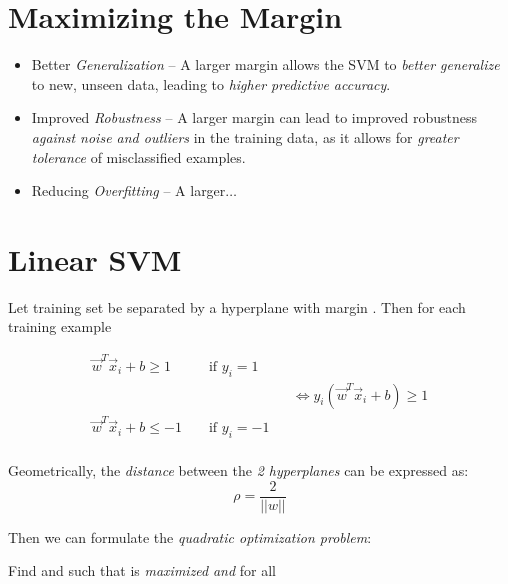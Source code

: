\documentclass[
	title={SVM}
]{cs584notes}
\begin{document}
\section{Maximizing the Margin}\label{sec:maximizing-the-margin}
\begin{itemize}
	\item Better \emph{Generalization} -- A larger margin allows the SVM to \emph{better generalize} to new, unseen data, leading to \emph{higher predictive accuracy}.
	\item Improved \emph{Robustness} -- A larger margin can lead to improved robustness \emph{against noise and outliers} in the training data, as it allows for \emph{greater tolerance} of misclassified examples.
	\item Reducing \emph{Overfitting} -- A larger$\dots$
\end{itemize}

\section{Linear SVM}\label{sec:linear-svm}
Let training set  be separated by a hyperplane with margin \data{$\rho$}.
Then for each training example 

\begin{equation*}
\begin{aligned}
	\vec{w}^{T}\vec{x}_{i} + b \geq 1 && \mbox{ if } y_{i} = 1 &&\\
	&&&& \Leftrightarrow y_{i}\left( \vec{w}^{T}\vec{x}_{i} + b \right) \geq 1\\
	\vec{w}^{T}\vec{x}_{i} + b \leq -1 && \mbox{ if } y_{i} = -1 &&\\
\end{aligned}
\end{equation*}

Geometrically, the \emph{distance} between the \emph{2 hyperplanes} can be expressed as:
\begin{equation}
	\rho = \frac{2}{||w||}
	\label{eq:hyperplane-distance}
\end{equation}

Then we can formulate the \emph{quadratic optimization problem}:

\begin{svmbox}
	Find  and  such that \data{\[ \rho = \frac{2}{||\vec{w}||} \]} is \emph{maximized} \emph{and} for all 
\end{svmbox}
\end{document}
